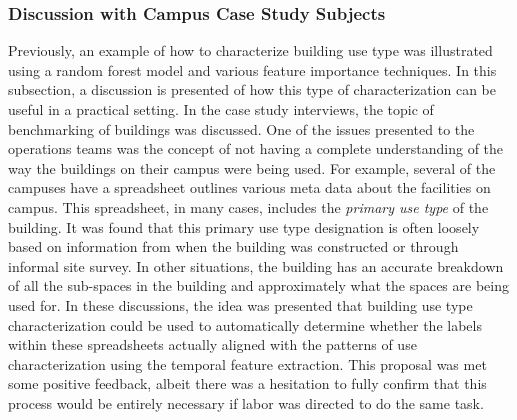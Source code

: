 \subsubsection{Discussion with Campus Case Study Subjects}
\label{sec:buildinguseclassificationdiscussion}

Previously, an example of how to characterize building use type was illustrated using a random forest model and various feature importance techniques. In this subsection, a discussion is presented of how this type of characterization can be useful in a practical setting. In the case study interviews, the topic of benchmarking of buildings was discussed. One of the issues presented to the operations teams was the concept of not having a complete understanding of the way the buildings on their campus were being used. For example, several of the campuses have a spreadsheet outlines various meta data about the facilities on campus. This spreadsheet, in many cases, includes the \emph{primary use type} of the building. It was found that this primary use type designation is often loosely based on information from when the building was constructed or through informal site survey. In other situations, the building has an accurate breakdown of all the sub-spaces in the building and approximately what the spaces are being used for. In these discussions, the idea was presented that building use type characterization could be used to automatically determine whether the labels within these spreadsheets actually aligned with the patterns of use characterization using the temporal feature extraction. This proposal was met some positive feedback, albeit there was a hesitation to fully confirm that this process would be entirely necessary if labor was directed to do the same task. 

